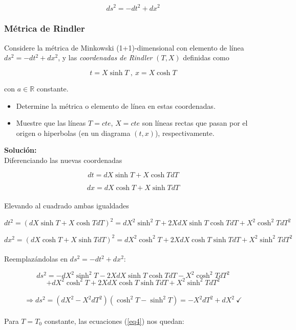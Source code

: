 $$ds^{2} = -dt^{2} + dx^{2}$$

\subsubsection{M\'etrica de Rindler}

Considere la m\'etrica de Minkowski (1+1)-dimensional con elemento de l\'inea $ds^{2} = -dt^{2} + dx^{2}$, y las \textit{coordenadas de Rindler} $(T, X)$ definidas como

\begin{equation}
    t = X\sinh{T} \ , \ x = X\cosh{T}
    \label{eq4}
\end{equation}

con $a \in \mathbb{R}$ constante.

\begin{itemize}
    \item Determine la m\'etrica o elemento de l\'inea en estas coordenadas.
    \item Muestre que las l\'ineas $T = cte$, $X = cte$ son l\'ineas rectas que pasan por el origen o hiperbolas (en un diagrama $(t, x)$), respectivamente.
\end{itemize}

\textbf{Soluci\'on:}\\

Diferenciando las nuevas coordenadas

$$dt = dX\sinh{T} + X\cosh{T}dT$$

$$dx = dX\cosh{T} + X\sinh{T}dT$$\\

Elevando al cuadrado ambas igualdades

$$dt^{2} = (dX\sinh{T} + X\cosh{T}dT)^{2} = dX^{2}\sinh^{2}{T} + 2XdX\sinh{T}\cosh{T}dT + X^{2}\cosh^{2}{T}dT^{2}$$

$$dx^{2} = (dX\cosh{T} + X\sinh{T}dT)^{2} = dX^{2}\cosh^{2}{T} + 2XdX\cosh{T}\sinh{T}dT + X^{2}\sinh^{2}{T}dT^{2}$$\\

Reemplaz\'andolas en $ds^{2} = -dt^{2} + dx^{2}$:

$$ds^{2} = -dX^{2}\sinh^{2}{T} - 2XdX\sinh{T}\cosh{T}dT - X^{2}\cosh^{2}{T}dT^{2}$$
$$+ dX^{2}\cosh^{2}{T} + 2XdX\cosh{T}\sinh{T}dT + X^{2}\sinh^{2}{T}dT^{2}$$\\
$$\Rightarrow ds^{2} = (dX^{2} - X^{2}dT^{2})(\cosh^{2}{T} - \sinh^{2}{T}) =  - X^{2}dT^{2} + dX^{2} \ \checkmark$$\\

Para $T = T_{0}$ constante, las ecuaciones (\ref{eq4}) nos quedan:


